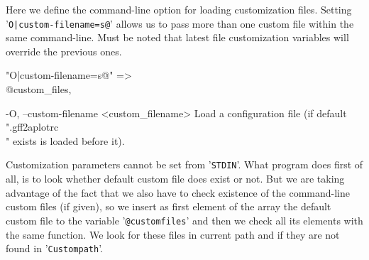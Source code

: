 \documentclass[11pt]{article}
\def\nwendcode{\endtrivlist \endgroup} %
\let\nwdocspar=\par                    %
\begin{document}

Here we define the command-line option for loading customization files. Setting '{\tt{}O|custom-filename=s@}' allows us to pass more than one custom file within the same command-line. Must be noted that latest file customization variables will override the previous ones.

\nwenddocs{}\plusendmoddef
"O|custom-filename=s@"  => \\@custom_files,
\nwendcode{}\nwdocspar
\nwenddocs{}\plusendmoddef
-O, --custom-filename <custom_filename> Load a configuration file 
         (if default \\".gff2aplotrc\\" exists is loaded before it).
\nwendcode{}\nwdocspar
\nwenddocs{}%
%
%
\nwdocspar
\nwenddocs{}%
%
%
\nwdocspar


Customization parameters cannot be set from '{\tt{}STDIN}'. What program does first of all, is to look whether default custom file does exist or not. But we are taking advantage of the fact that we also have to check existence of the command-line custom files (if given), so we insert as first element of the array the default custom file to the variable '{\tt{}@custom{}files}' and then we check all its elements with the same function. We look for these files in current path and if they are not found in '{\tt{}{}Custom{}path}'.
\end{document}
